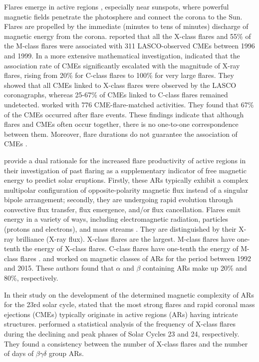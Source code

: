 \documentclass[draft]{agujournal2019}
\begin{document}
Flares emerge in active regions \citep{2005ApJ...629.1141A},
especially near sunspots, where powerful magnetic fields penetrate the photosphere and connect the corona to the Sun. Flares are propelled by the immediate (minutes to tens of minutes) discharge of magnetic energy from the corona. 
\citet{2003SoPh..218..261A} reported that all the X-class flares and 55\% of the M-class flares were associated with 311 LASCO-observed CMEs between 1996 and 1999. In a more extensive mathematical investigation, \citet{2005JGRA..11012S05Y}
indicated that the association rate of CMEs significantly escalated with the magnitude of X-ray flares, 
rising from 20\% for C-class flares to 100\% for very large flares. They showed that all CMEs linked to X-class flares were observed by the LASCO coronagraphs, whereas 25-67\% of CMEs linked to C-class flares remained undetected. 
\citet{2012JAsGe...1..172Y} worked with 776 CME-flare-matched activities. They found that 67\% of the CMEs occurred after flare events. These findings indicate that although flares and CMEs
often occur together, there is no one-to-one correspondence
between them. Moreover, flare durations do not guarantee the association of CMEs \citep{1995A&A...304..585H}. 

\citet{Falconer_2012} provide a dual rationale for the increased flare productivity of active regions in their investigation of past flaring as a supplementary indicator of free magnetic energy to predict solar eruptions. Firstly, these ARs typically exhibit a complex multipolar configuration of opposite-polarity magnetic flux instead of a singular bipole arrangement; secondly, they are undergoing rapid evolution through convective flux transfer, flux emergence, and/or flux cancellation. Flares emit energy in a variety of ways, including electromagnetic radiation, particles (protons and electrons), and mass streams \citep{2012annG...55...49B}. They are distinguished by their X-ray brilliance (X-ray flux). X-class flares are the largest. M-class flares have one-tenth the energy of
X-class flares. C-class flares have one-tenth the energy of
M-class flares \citep{1989ARA&A..27..421B}.
\citet{2012ApJ...760...31K} and \citet{2016ApJ...820L..11J}
worked on magnetic classes of ARs for the period between 1992 and 2015. These authors found that $\alpha$ and $\beta$ containing ARs make up 20\% and 80\%, respectively. 

In their study on the development of the determined magnetic complexity of ARs for the 23rd solar cycle, \citet{10.1111/j.1365-2966.2010.16465.x} stated that the most strong flares and rapid coronal mass ejections (CMEs) typically originate in active regions (ARs) having intricate structures. \citet{MOHAMED2018249} 
performed a statistical analysis of the frequency of X-class flares during the declining and peak phases of Solar Cycles 23 and 24, respectively. They found a consistency between 
the number of X-class flares and the number of days of $\beta$$\gamma$$\delta$ group ARs.
\end{document}
